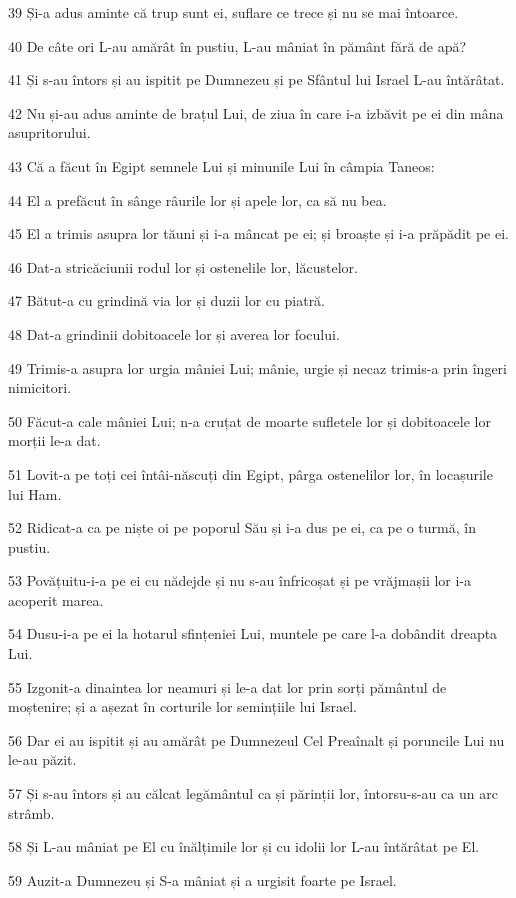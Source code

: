 \par 39 Și-a adus aminte că trup sunt ei, suflare ce trece și nu se mai întoarce.
\par 40 De câte ori L-au amărât în pustiu, L-au mâniat în pământ fără de apă?
\par 41 Și s-au întors și au ispitit pe Dumnezeu și pe Sfântul lui Israel L-au întărâtat.
\par 42 Nu și-au adus aminte de brațul Lui, de ziua în care i-a izbăvit pe ei din mâna asupritorului.
\par 43 Că a făcut în Egipt semnele Lui și minunile Lui în câmpia Taneos:
\par 44 El a prefăcut în sânge râurile lor și apele lor, ca să nu bea.
\par 45 El a trimis asupra lor tăuni și i-a mâncat pe ei; și broaște și i-a prăpădit pe ei.
\par 46 Dat-a stricăciunii rodul lor și ostenelile lor, lăcustelor.
\par 47 Bătut-a cu grindină via lor și duzii lor cu piatră.
\par 48 Dat-a grindinii dobitoacele lor și averea lor focului.
\par 49 Trimis-a asupra lor urgia mâniei Lui; mânie, urgie și necaz trimis-a prin îngeri nimicitori.
\par 50 Făcut-a cale mâniei Lui; n-a cruțat de moarte sufletele lor și dobitoacele lor morții le-a dat.
\par 51 Lovit-a pe toți cei întâi-născuți din Egipt, pârga ostenelilor lor, în locașurile lui Ham.
\par 52 Ridicat-a ca pe niște oi pe poporul Său și i-a dus pe ei, ca pe o turmă, în pustiu.
\par 53 Povățuitu-i-a pe ei cu nădejde și nu s-au înfricoșat și pe vrăjmașii lor i-a acoperit marea.
\par 54 Dusu-i-a pe ei la hotarul sfințeniei Lui, muntele pe care l-a dobândit dreapta Lui.
\par 55 Izgonit-a dinaintea lor neamuri și le-a dat lor prin sorți pământul de moștenire; și a așezat în corturile lor semințiile lui Israel.
\par 56 Dar ei au ispitit și au amărât pe Dumnezeul Cel Preaînalt și poruncile Lui nu le-au păzit.
\par 57 Și s-au întors și au călcat legământul ca și părinții lor, întorsu-s-au ca un arc strâmb.
\par 58 Și L-au mâniat pe El cu înălțimile lor și cu idolii lor L-au întărâtat pe El.
\par 59 Auzit-a Dumnezeu și S-a mâniat și a urgisit foarte pe Israel.
